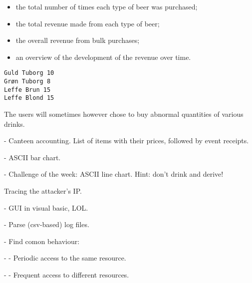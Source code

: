 \begin{itemize}

\item the total number of times each type of beer was purchased;

\item the total revenue made from each type of beer;

\item the overall revenue from bulk purchases;

\item an overview of the development of the revenue over time.

\end{itemize}

\begin{verbatim}
Guld Tuborg 10
Grøn Tuborg 8
Leffe Brun 15
Leffe Blond 15
\end{verbatim}

The users will
sometimes however chose to buy abnormal quantities of various drinks.

- Canteen accounting. List of items with their prices, followed by event
  receipts.

- ASCII bar chart.

- Challenge of the week: ASCII line chart. Hint: don't drink and derive!

Tracing the attacker's IP.

- GUI in visual basic, LOL.

- Parse (csv-based) log files.

- Find comon behaviour:

- - Periodic access to the same resource.

- - Frequent access to different resources.
